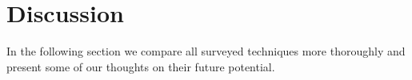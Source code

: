 \section{Discussion} 
\label{sec:disc}

In the following section we compare all surveyed techniques more thoroughly and present some of our thoughts on their future potential.

